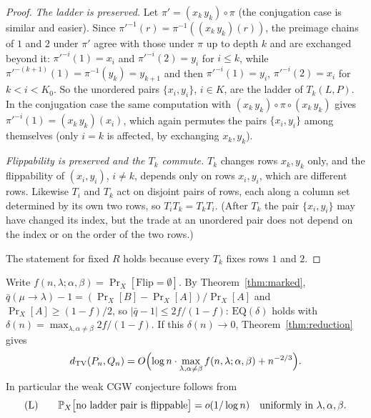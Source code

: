 \begin{proof}
\emph{The ladder is preserved.}  Let $\pi'=(x_k\,y_k)\circ\pi$ (the
conjugation case is similar and easier).  Since
$\pi'^{-1}(r)=\pi^{-1}((x_k\,y_k)(r))$, the preimage chains of $1$ and
$2$ under $\pi'$ agree with those under $\pi$ up to depth $k$ and are
exchanged beyond it: $\pi'^{-i}(1)=x_i$ and $\pi'^{-i}(2)=y_i$ for
$i\le k$, while $\pi'^{-(k+1)}(1)=\pi^{-1}(y_k)=y_{k+1}$ and then
$\pi'^{-i}(1)=y_i$, $\pi'^{-i}(2)=x_i$ for $k<i<K_0$.  So the unordered
pairs $\{x_i,y_i\}$, $i\in K$, are the ladder of $T_k(L,P)$.  In the
conjugation case the same computation with $(x_k\,y_k)\circ\pi\circ(x_k\,y_k)$
gives $\pi'^{-i}(1)=(x_k\,y_k)(x_i)$, which again permutes the pairs
$\{x_i,y_i\}$ among themselves (only $i=k$ is affected, by exchanging
$x_k,y_k$).

\emph{Flippability is preserved and the $T_k$ commute.}  $T_k$ changes
rows $x_k,y_k$ only, and the flippability of $(x_i,y_i)$, $i\ne k$,
depends only on rows $x_i,y_i$, which are different rows.  Likewise
$T_i$ and $T_k$ act on disjoint pairs of rows, each along a column set
determined by its own two rows, so $T_iT_k=T_kT_i$.  (After $T_k$ the
pair $\{x_i,y_i\}$ may have changed its index, but the trade at an
unordered pair does not depend on the index or on the order of the
two rows.)

The statement for fixed $R$ holds because every $T_k$ fixes rows $1$
and $2$.
\end{proof}

\begin{corollary}\label{cor:ladder}
Write $f(n,\lambda;\alpha,\beta)=\Pr_X[\mathrm{Flip}=\emptyset]$.  By
Theorem~\ref{thm:marked}, $\bar q(\mu\to\lambda)-1=(\Pr_X[B]-\Pr_X[A])/\Pr_X[A]$
and $\Pr_X[A]\ge(1-f)/2$, so $|\bar q-1|\le2f/(1-f)$: $\mathrm{EQ}(\delta)$
holds with $\delta(n)=\max_{\lambda,\alpha\ne\beta}2f/(1-f)$.  If this
$\delta(n)\to0$, Theorem~\ref{thm:reduction} gives
\[
\dtv(\PP_n,\QQ_n)=O\Bigl(\log n\cdot\max_{\lambda,\alpha\ne\beta}
f(n,\lambda;\alpha,\beta)+n^{-2/3}\Bigr).
\]
In particular the weak CGW conjecture follows from
\begin{equation}\label{eq:L}
\textup{(L)}\qquad \Pr_X\bigl[\text{no ladder pair is flippable}\bigr]=o(1/\log n)
\quad\text{uniformly in }\lambda,\alpha,\beta .
\end{equation}
\end{corollary}

